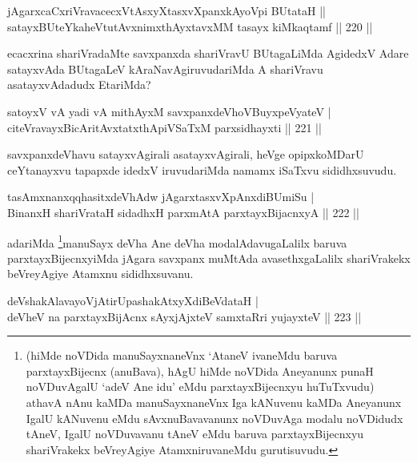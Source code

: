 \begin{shl}
jAgarxcaCxriVravacecxVtAsxyXtasxvXpanxkAyoV\s pi BUtataH ||  \\
satayxBUteYkaheVtutAvxnimxthAyxtavxMM tasayx kiMkaqtamf \hfill ||  220 ||  
\end{shl}

\begin{artha}
ecacxrina shariVradaMte savxpanxda shariVravU BUtagaLiMda AgidedxV Adare satayxvAda BUtagaLeV kAraNavAgiruvudariMda A shariVravu asatayxvAdadudx EtariMda?
\end{artha}

\begin{shl}
satoyxV vA yadi vA mithAyxM savxpanxdeVhoV\s BuyxpeVyateV | \\
citeVravayxBicAritAvxtatxthA\s piVSaTxM parxsidhayxti \hfill ||  221 ||  
\end{shl}

\begin{artha}
savxpanxdeVhavu satayxvAgirali asatayxvAgirali, heVge opipxkoMDarU ceYtanayxvu tapapxde idedxV iruvudariMda namamx iSaTxvu sididhxsuvudu.
\end{artha}

\begin{shl}
tasAmxnanxqqhasitxdeVhAdw jAgarxtasxvXpAnxdiBUmiSu | \\
BinanxH shariVrataH sidadhxH parxmAtA parxtayxBijacnxyA \hfill ||  222 || 
\end{shl}

\begin{artha}
adariMda \footnote{(hiMde noVDida manuSayxnaneVnx `AtaneV ivaneMdu baruva parxtayxBijecnx (anuBava), hAgU hiMde noVDida Aneyanunx punaH noVDuvAgalU `adeV Ane idu' eMdu parxtayxBijecnxyu huTuTxvudu) athavA nAnu kaMDa manuSayxnaneVnx Iga kANuvenu kaMDa Aneyanunx IgalU kANuvenu eMdu sAvxnuBavavanunx  noVDuvAga modalu noVDidudx tAneV, IgalU noVDuvavanu tAneV eMdu baruva parxtayxBijecnxyu shariVrakekx beVreyAgiye AtamxniruvaneMdu gurutisuvudu.}manuSayx deVha Ane deVha modalAdavugaLalilx baruva parxtayxBijecnxyiMda jAgara savxpanx muMtAda avasethxgaLalilx shariVrakekx beVreyAgiye Atamxnu sididhxsuvanu.
\end{artha}

\begin{shl}
deVshakAlavayoVjAtirUpashakAtxyXdiBeVdataH | \\
deVheV na parxtayxBijAcnx sAyxjAjxteV samxtaRri yujayxteV \hfill ||  223 ||  
\end{shl}

